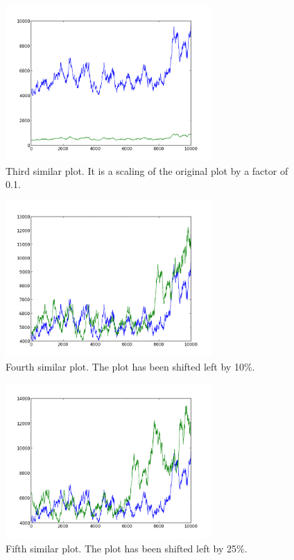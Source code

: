 \begin{figure}[h!]
    \centering
    \includegraphics[width=0.7\textwidth]{images/mutant_3.png}
    \caption{Third similar plot.  It is a scaling of the original plot by a factor of 0.1.}
    \label{fig:mutant_3}
\end{figure}

\begin{figure}[h!]
    \centering
    \includegraphics[width=0.7\textwidth]{images/mutant_4.png}
    \caption{Fourth similar plot.  The plot has been shifted left by 10\%.}
    \label{fig:mutant_4}
\end{figure}

\begin{figure}[h!]
    \centering
    \includegraphics[width=0.7\textwidth]{images/mutant_5.png}
    \caption{Fifth similar plot.  The plot has been shifted left by 25\%.}
    \label{fig:mutant_5}
\end{figure}

